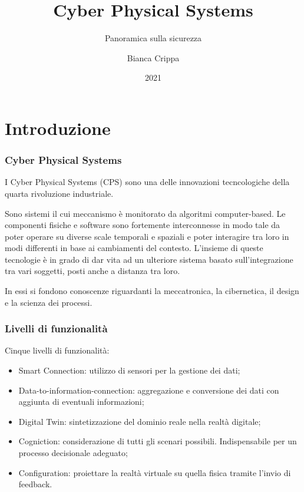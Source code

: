 \documentclass{beamer}
\title{Cyber Physical Systems}
\subtitle{Panoramica sulla sicurezza}
\author{Bianca Crippa}
\date{2021}
\begin{document}
\frame{\titlepage}


\section{Introduzione}

\begin{frame}
    \frametitle{Cyber Physical Systems}
    I Cyber Physical Systems (CPS) sono una delle innovazioni tecncologiche della quarta rivoluzione industriale.
    
    Sono sistemi il cui meccanismo è monitorato da algoritmi computer-based. 
    Le componenti fisiche e software sono fortemente interconnesse in modo tale da poter operare su diverse scale temporali e spaziali e poter interagire tra loro in modi differenti in base ai cambiamenti del contesto. L'insieme di queste tecnologie è in grado di dar vita ad un ulteriore sistema basato sull'integrazione tra vari soggetti, posti anche a distanza tra loro.
    
    In essi si fondono conoscenze riguardanti la meccatronica, la cibernetica, il design e la scienza dei processi.
    
\end{frame}

\begin{frame}
\frametitle{Livelli di funzionalità}

    Cinque livelli di funzionalità:
    \begin{itemize}
        \item Smart Connection: utilizzo di sensori per la gestione dei dati;
        \item Data-to-information-connection: aggregazione e conversione dei dati con aggiunta di eventuali informazioni;
        \item Digital Twin: sintetizzazione del dominio reale nella realtà digitale;
        \item Cogniction: considerazione di tutti gli scenari possibili. Indispensabile per un processo decisionale adeguato;
        \item Configuration: proiettare la realtà virtuale su quella fisica tramite l'invio di feedback.
    \end{itemize}
    
\end{frame}
\end{document}
